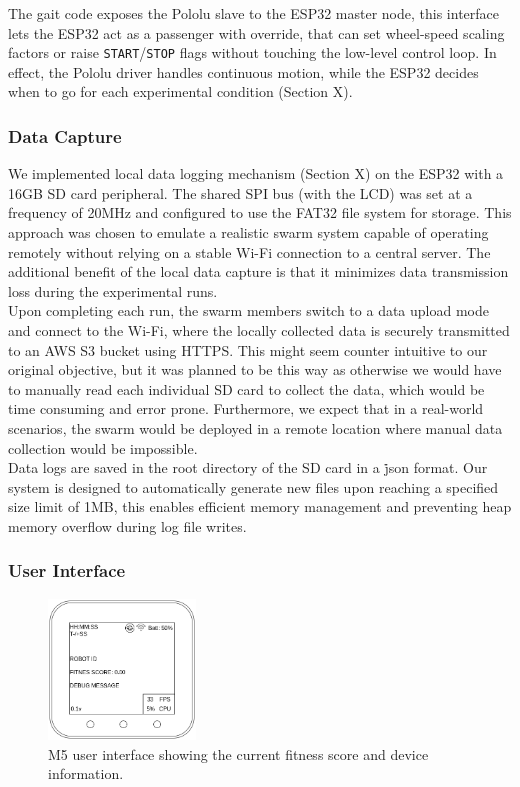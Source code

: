 \documentclass[conference]{IEEEtran}
\begin{document}
The gait code exposes the Pololu slave to the ESP32 master node, this interface lets the ESP32 act as a passenger with override, that can set wheel-speed scaling factors or raise \texttt{START}/\texttt{STOP} flags without touching the low-level control loop.  In effect, the Pololu driver handles continuous motion, while the ESP32 decides when to go for each experimental condition (Section X).

\subsubsection{Data Capture}
We implemented local data logging mechanism (Section X) on the ESP32 with a 16GB SD card peripheral. The shared SPI bus (with the LCD) was set at a frequency of 20MHz and configured to use the FAT32 file system for storage. This approach was chosen to emulate a realistic swarm system capable of operating remotely without relying on a stable Wi-Fi connection to a central server. The additional benefit of the local data capture is that it minimizes data transmission loss during the experimental runs.\\

Upon completing each run, the swarm members switch to a data upload mode and connect to the Wi-Fi, where the locally collected data is securely transmitted to an AWS S3 bucket using HTTPS. This might seem counter intuitive to our original objective, but it was planned to be this way as otherwise we would have to manually read each individual SD card to collect the data, which would be time consuming and error prone. Furthermore, we expect that in a real-world scenarios, the swarm would be deployed in a remote location where manual data collection would be impossible.\\

Data logs are saved in the root directory of the SD card in a \.json format. Our system is designed to automatically generate new files upon reaching a specified size limit of 1MB, this enables efficient memory management and preventing heap memory overflow during log file writes.

\subsubsection{User Interface}

\begin{figure}[h]
    \centering
    \includegraphics[width=0.35\textwidth]{UI.png}
    \caption{M5 user interface showing the current fitness score and device information.}
    \label{fig:UI}
\end{figure}
\end{document}
